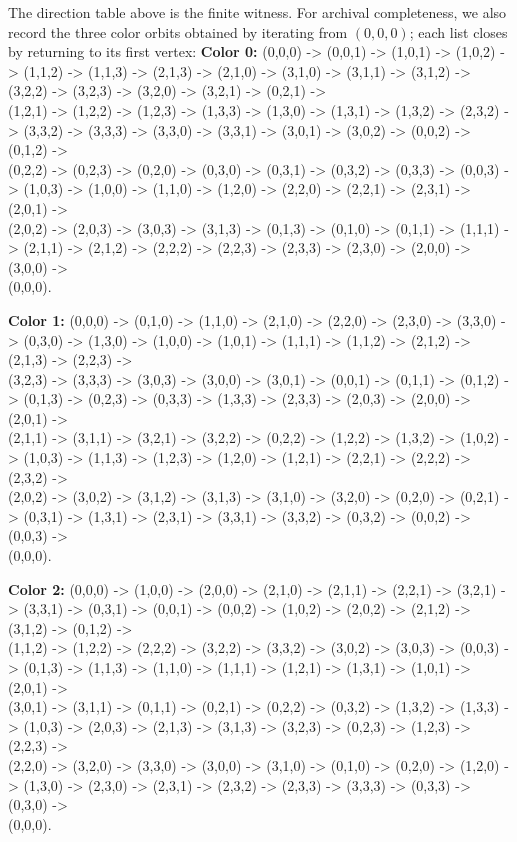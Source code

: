 \documentclass[11pt]{article}
\begin{document}
The direction table above is the finite witness.
For archival completeness, we also record the three color orbits obtained by iterating from $(0,0,0)$; each list closes by returning to its first vertex:
\begingroup
\footnotesize\ttfamily
\noindent\textbf{Color 0: }(0,0,0) -> (0,0,1) -> (1,0,1) -> (1,0,2) -> (1,1,2) -> (1,1,3) -> (2,1,3) -> (2,1,0) -> (3,1,0) -> (3,1,1) -> (3,1,2) -> (3,2,2) -> (3,2,3) -> (3,2,0) -> (3,2,1) -> (0,2,1) ->\\
(1,2,1) -> (1,2,2) -> (1,2,3) -> (1,3,3) -> (1,3,0) -> (1,3,1) -> (1,3,2) -> (2,3,2) -> (3,3,2) -> (3,3,3) -> (3,3,0) -> (3,3,1) -> (3,0,1) -> (3,0,2) -> (0,0,2) -> (0,1,2) ->\\
(0,2,2) -> (0,2,3) -> (0,2,0) -> (0,3,0) -> (0,3,1) -> (0,3,2) -> (0,3,3) -> (0,0,3) -> (1,0,3) -> (1,0,0) -> (1,1,0) -> (1,2,0) -> (2,2,0) -> (2,2,1) -> (2,3,1) -> (2,0,1) ->\\
(2,0,2) -> (2,0,3) -> (3,0,3) -> (3,1,3) -> (0,1,3) -> (0,1,0) -> (0,1,1) -> (1,1,1) -> (2,1,1) -> (2,1,2) -> (2,2,2) -> (2,2,3) -> (2,3,3) -> (2,3,0) -> (2,0,0) -> (3,0,0) ->\\
(0,0,0).\par\medskip
\noindent\textbf{Color 1: }(0,0,0) -> (0,1,0) -> (1,1,0) -> (2,1,0) -> (2,2,0) -> (2,3,0) -> (3,3,0) -> (0,3,0) -> (1,3,0) -> (1,0,0) -> (1,0,1) -> (1,1,1) -> (1,1,2) -> (2,1,2) -> (2,1,3) -> (2,2,3) ->\\
(3,2,3) -> (3,3,3) -> (3,0,3) -> (3,0,0) -> (3,0,1) -> (0,0,1) -> (0,1,1) -> (0,1,2) -> (0,1,3) -> (0,2,3) -> (0,3,3) -> (1,3,3) -> (2,3,3) -> (2,0,3) -> (2,0,0) -> (2,0,1) ->\\
(2,1,1) -> (3,1,1) -> (3,2,1) -> (3,2,2) -> (0,2,2) -> (1,2,2) -> (1,3,2) -> (1,0,2) -> (1,0,3) -> (1,1,3) -> (1,2,3) -> (1,2,0) -> (1,2,1) -> (2,2,1) -> (2,2,2) -> (2,3,2) ->\\
(2,0,2) -> (3,0,2) -> (3,1,2) -> (3,1,3) -> (3,1,0) -> (3,2,0) -> (0,2,0) -> (0,2,1) -> (0,3,1) -> (1,3,1) -> (2,3,1) -> (3,3,1) -> (3,3,2) -> (0,3,2) -> (0,0,2) -> (0,0,3) ->\\
(0,0,0).\par\medskip
\noindent\textbf{Color 2: }(0,0,0) -> (1,0,0) -> (2,0,0) -> (2,1,0) -> (2,1,1) -> (2,2,1) -> (3,2,1) -> (3,3,1) -> (0,3,1) -> (0,0,1) -> (0,0,2) -> (1,0,2) -> (2,0,2) -> (2,1,2) -> (3,1,2) -> (0,1,2) ->\\
(1,1,2) -> (1,2,2) -> (2,2,2) -> (3,2,2) -> (3,3,2) -> (3,0,2) -> (3,0,3) -> (0,0,3) -> (0,1,3) -> (1,1,3) -> (1,1,0) -> (1,1,1) -> (1,2,1) -> (1,3,1) -> (1,0,1) -> (2,0,1) ->\\
(3,0,1) -> (3,1,1) -> (0,1,1) -> (0,2,1) -> (0,2,2) -> (0,3,2) -> (1,3,2) -> (1,3,3) -> (1,0,3) -> (2,0,3) -> (2,1,3) -> (3,1,3) -> (3,2,3) -> (0,2,3) -> (1,2,3) -> (2,2,3) ->\\
(2,2,0) -> (3,2,0) -> (3,3,0) -> (3,0,0) -> (3,1,0) -> (0,1,0) -> (0,2,0) -> (1,2,0) -> (1,3,0) -> (2,3,0) -> (2,3,1) -> (2,3,2) -> (2,3,3) -> (3,3,3) -> (0,3,3) -> (0,3,0) ->\\
(0,0,0).\par
\endgroup
\end{document}
